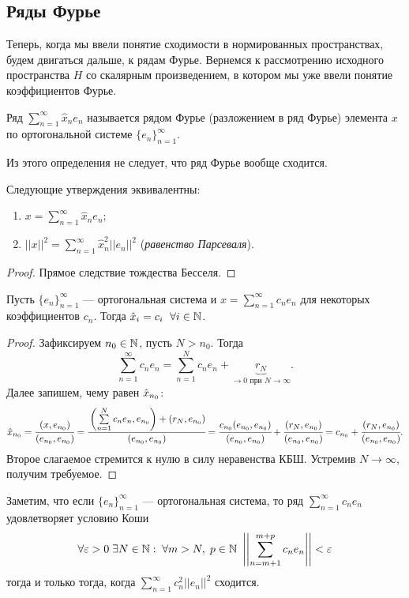 \subsection{Ряды Фурье}
Теперь, когда мы ввели понятие сходимости в нормированных пространствах, будем двигаться дальше, к рядам Фурье. Вернемся к рассмотрению исходного пространства $H$ со скалярным произведением, в котором мы уже ввели понятие коэффициентов Фурье.
\begin{Def}
    Ряд $\sum\limits_{n=1}^{\infty} \hat{x}_ne_n$ называется рядом Фурье (разложением в ряд Фурье) элемента $x$ по ортогональной системе $\{e_n\}_{n=1}^{\infty}$.
\end{Def}
Из этого определения не следует, что ряд Фурье вообще сходится.
\begin{Statement}
    Следующие утверждения эквивалентны:
    \begin{enumerate}
        \item $x = \sum\limits_{n=1}^{\infty} \hat{x}_ne_n$;
        \item $||x||^2 = \sum\limits_{n=1}^{\infty} \hat{x}^2_n ||e_n||^2$ (\textit{равенство Парсеваля}).
    \end{enumerate}
\end{Statement}
\begin{proof}
    Прямое следствие тождества Бесселя.
\end{proof}
\begin{Statement}
    Пусть $\{e_n\}_{n=1}^{\infty}$ --- ортогональная система и $x = \sum\limits_{n=1}^{\infty}c_n e_n$ для некоторых коэффициентов $c_n$. Тогда $\hat{x}_i = c_i\;\ \forall i \in \mathbb{N}$.
\end{Statement}
\begin{proof}
    Зафиксируем $n_0\in \mathbb{N}$, пусть $N>n_0$. Тогда
    $$
        \sum\limits_{n=1}^{\infty} c_ne_n = \sum \limits_{n=1}^{N}c_n e_n + \underbrace{r_N}_{\to 0 \text{ при } N\to \infty}.
    $$
    Далее запишем, чему равен $\hat{x}_{n_0}$:
    $$
        \hat{x}_{n_0} = \cfrac{(x,e_{n_0})}{(e_{n_0}, e_{n_0})} = \cfrac{\left(\sum\limits_{n=1}^{N} c_ne_n, e_{n_0}\right) + \left(r_N, e_{n_0}\right)}{(e_{n_0}, e_{n_0})} = \cfrac{c_{n_0}(e_{n_0}, e_{n_0})}{(e_{n_0}, e_{n_0})} + \cfrac{(r_N, e_{n_0})}{(e_{n_0}, e_{n_0})} = c_{n_0} + \cfrac{(r_N, e_{n_0})}{(e_{n_0}, e_{n_0})}.
    $$
    Второе слагаемое стремится к нулю в силу неравенства КБШ. Устремив $N \to \infty$, получим требуемое.
\end{proof}
\begin{Statement}
Заметим, что если $\{e_n\}_{n=1}^{\infty}$ --- ортогональная система, то ряд $\sum\limits_{n=1}^{\infty} c_n e_n$ удовлетворяет условию Коши 
$$
    \forall \varepsilon>0\; \exists N\in \mathbb{N}:\; \forall m>N,\; p\in \mathbb{N} \  \left|\left|\sum\limits_{n=m+1}^{m+p}c_ne_n \right|\right| < \varepsilon
$$
тогда и только тогда, когда $\sum\limits_{n=1}^{\infty}c_n^2||e_n||^2$ сходится.
\end{Statement}
